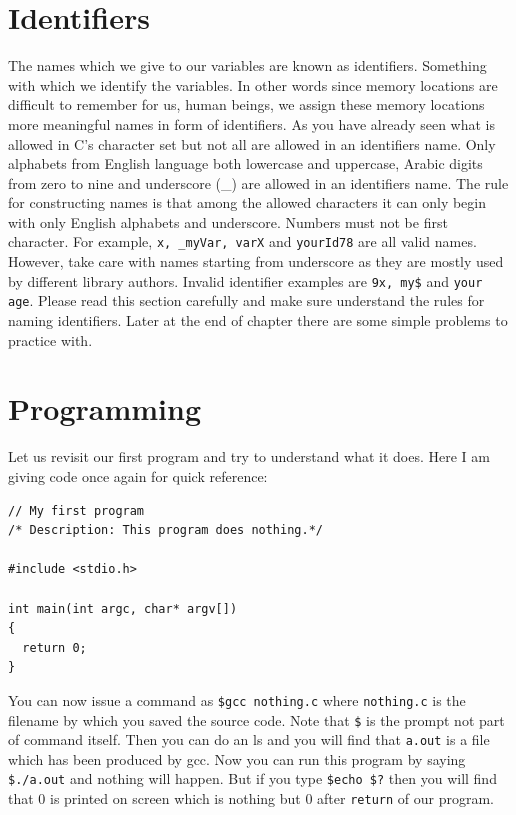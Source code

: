 \section{Identifiers}
The names which we give to our variables are known as identifiers. Something 
with which we identify the variables. In other words since memory locations are
difficult to remember for us, human beings, we assign these memory locations
more meaningful names in form of identifiers. As you have already seen what is
allowed  in C's character set but not all are allowed in an identifiers
name. Only alphabets from English language both lowercase and uppercase,
Arabic digits from zero to nine and underscore (\_) are allowed in an
identifiers name. The rule for constructing names is that among the allowed
characters it can only begin with only English alphabets and
underscore. Numbers must not be first character. For example, \texttt{x,
  \_myVar, varX} and \texttt{yourId78} are all valid names. However, take care
with names starting from underscore as they are mostly used by different
library authors. Invalid identifier examples are \texttt{9x, my\$} and
\texttt{your age}. Please read this section carefully and make sure understand
the rules for naming identifiers. Later at the end of chapter there are some
simple problems to practice with.

\section{Programming}
Let us revisit our first program and try to understand what it does. Here I am 
giving code once again for quick reference:

\begin{verbatim}
// My first program
/* Description: This program does nothing.*/

#include <stdio.h>

int main(int argc, char* argv[])
{
  return 0;
}
\end{verbatim}

You can now issue a command as \texttt{\$gcc nothing.c} where 
\texttt{nothing.c} is the filename by which you saved the source code. Note 
that \texttt{\$} is the prompt not part of command itself. Then you can do an 
ls and you will find that \texttt{a.out} is a file which has been produced by 
gcc. Now you can run this program by saying \texttt{\$./a.out} and nothing 
will happen. But if you type \texttt{\$echo \$?} then you will find that 0 is 
printed on screen which is nothing but 0 after \texttt{return} of our program.

